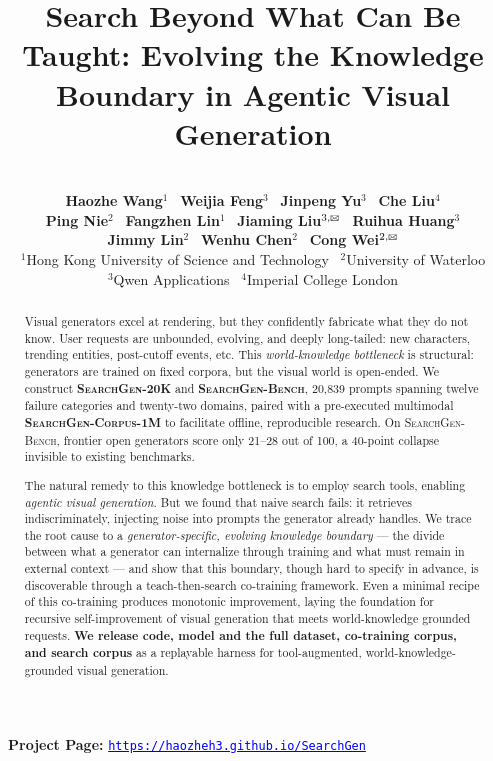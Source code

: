 \documentclass{article}
\title{Search Beyond What Can Be Taught: 
Evolving the Knowledge Boundary in Agentic Visual Generation}
\author{\vspace{-2em} \\
    \textbf{Haozhe Wang}$^{1}$ \
    \textbf{Weijia Feng}$^{3}$ \
    \textbf{Jinpeng Yu}$^{3}$ \
    \textbf{Che Liu}$^{4}$ \\
    \textbf{Ping Nie}$^{2}$ \
    \textbf{Fangzhen Lin}$^{1}$ \
    \textbf{Jiaming Liu}$^{3,\text{\Letter}}$ \
    \textbf{Ruihua Huang}$^{3}$ \\
    \textbf{Jimmy Lin}$^{2}$ \
    \textbf{Wenhu Chen}$^{2}$ \
    \textbf{Cong Wei}$^{2,\text{\Letter}}$ \vspace{0.3em} \\
    $^{1}$Hong Kong University of Science and Technology \
    $^{2}$University of Waterloo \\
    $^{3}$Qwen Applications \
    $^{4}$Imperial College London
}
\newcommand{\linkcolor}[1]{\textcolor{blue}{#1}}
\newcommand{\bench}{\textsc{SearchGen-Bench}}
\newcommand{\dataset}{\textsc{SearchGen-20K}}
\newcommand{\searchcorpus}{\textsc{SearchGen-Corpus-1M}}
\newcommand{\website}{https://haozheh3.github.io/SearchGen}
\begin{document}
{
  \renewcommand{\thefootnote}{} 
}


\vspace*{-3.5em} 
\maketitle
\begin{center}
\vspace{-3em}
\faGlobe\ \textbf{Project Page: }
\href{\website}{\linkcolor{\texttt{\website}}}
\end{center}



\begin{abstract}
  \vspace{-0.5em}
    Visual generators excel at rendering, but they confidently fabricate what they do not know.
    User requests are unbounded, evolving, and deeply long-tailed: new characters, trending entities, post-cutoff events, etc.
    This \emph{world-knowledge bottleneck} is structural: generators are trained on fixed corpora,
    but the visual world is open-ended.
    We construct \textbf{\dataset{}} and \textbf{\bench{}}, 20{,}839 prompts spanning twelve failure categories
    and twenty-two domains, paired with a pre-executed multimodal \textbf{\searchcorpus{}} to facilitate offline, reproducible research.
    On \bench{}, frontier open generators score only 21--28 out of 100, a 40-point collapse
    invisible to existing benchmarks.

    The natural remedy to this knowledge bottleneck is to employ search tools, enabling \emph{agentic visual generation}. But we found that naive search fails: it retrieves indiscriminately,
    injecting noise into prompts the generator already handles.
     We trace the root cause to a \emph{generator-specific{, evolving} knowledge boundary} --- the divide
  between what a generator can internalize through training and what must remain in
  external context --- and show that this boundary, though hard to specify in advance,
  is discoverable through a teach-then-search co-training framework.
  Even a minimal recipe of this co-training produces monotonic improvement, laying the foundation for recursive self-improvement of visual generation that meets world-knowledge grounded requests.
\textbf{  We release code, model and the full dataset, co-training corpus, and search corpus} as a
  replayable {harness} for {tool-augmented,} world-knowledge-grounded visual generation.
\end{abstract}
\end{document}
